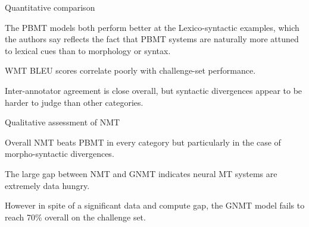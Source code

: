 \documentclass{beamer}
\begin{document}
\begin{frame}{Quantitative comparison}

  The PBMT models both perform better at the Lexico-syntactic examples, which the authors say reflects the fact that PBMT systems are naturally more attuned to lexical cues than to morphology or syntax.

  \medskip

  WMT BLEU scores correlate poorly with challenge-set performance.

  \medskip

  Inter-annotator agreement is close overall, but syntactic divergences appear to be harder to judge than other categories.

\end{frame}

\begin{frame}{Qualitative assessment of NMT}

  Overall NMT beats PBMT in every category but particularly in the case of morpho-syntactic divergences.

  \medskip

  The large gap between NMT and GNMT indicates neural MT systems are extremely data hungry.

  \medskip

  However in spite of a significant data and compute gap, the GNMT model fails to reach 70\% overall on the challenge set.

\end{frame}
\end{document}
